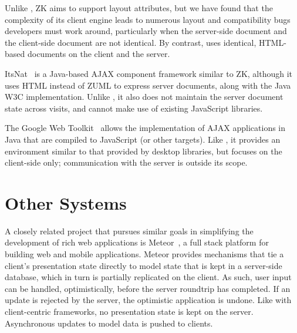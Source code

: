 Unlike \projectname{}, ZK aims to support layout attributes, but
we have found that the complexity of its client engine leads to 
numerous layout and compatibility bugs developers must work around,
particularly when the server-side document and the client-side
document are not identical.  By contrast, \cb uses identical, HTML-based
documents on the client and the server.

ItsNat~\cite{JoseMariaArranzSantamariaItsNat} is a Java-based AJAX
component framework similar to ZK, although it uses HTML instead of
ZUML to express server documents, along with the Java W3C implementation.  
Unlike \projectname, it also does not maintain the server document 
state across visits, and cannot make use of existing JavaScript libraries.

The Google Web Toolkit~\cite{GWT} allows the implementation of
AJAX applications in Java that are compiled to JavaScript (or other
targets).  Like \projectname, it provides an environment similar to 
that provided by desktop libraries, but focuses on the client-side only; 
communication with the server is outside its scope.






\section{Other Systems}

A closely related project that pursues similar goals in simplifying the development
of rich web applications is Meteor~\cite{meteor}, a full stack platform for building 
web and mobile applications.  Meteor provides mechanisms that tie a client's presentation
state directly to model state that is kept in a server-side database, which in turn is 
partially replicated on the client.  As such, user input can be handled, optimistically, before 
the server roundtrip has completed. If an update is rejected by the server, the optimistic 
application is undone. Like with client-centric frameworks, no presentation state is kept on
the server. Asynchronous updates to model data is pushed to clients.

